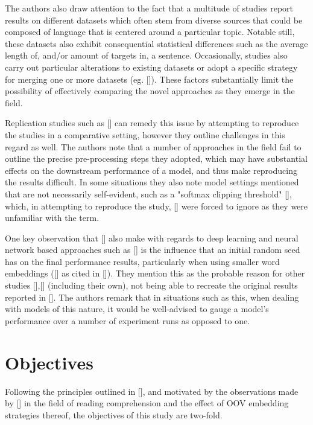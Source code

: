 \documentclass[12pt, a4paper]{report}
\theoremstyle{definition}
\theoremstyle{definition}%
\theoremstyle{definition}%
\theoremstyle{definition}%
\theoremstyle{definition}%
\theoremstyle{definition}%
\renewcommand{\cite}[1]{[\citealp{#1}]}
\begin{document}
The authors also draw attention to the fact that a multitude of studies report results on different datasets which often stem from diverse sources that could be composed of language that is centered around a particular topic. Notable still, these datasets also exhibit consequential statistical differences such as the average length of, and/or amount of targets in, a sentence. Occasionally, studies also carry out particular alterations to existing datasets or adopt a specific strategy for merging one or more datasets (eg. \cite{xue2018}). These factors substantially limit the possibility of effectively comparing the novel approaches as they emerge in the field.  

Replication studies such as \cite{moore2018} can remedy this issue by attempting to reproduce the studies in a comparative setting, however they outline challenges in this regard as well. The authors note that a number of approaches in the field fail to outline the precise pre-processing steps they adopted, which may have substantial effects on the downstream performance of a model, and thus make reproducing the results difficult. In some situations they also note model settings mentioned that are not necessarily self-evident, such as a "softmax clipping threshold" \cite{tang2016b}, which, in attempting to reproduce the study, \cite{moore2018} were forced to ignore as they were unfamiliar with the term. 

One key observation that \cite{moore2018} also make with regards to deep learning and neural network based approaches such as \cite{tang2016b} is the influence that an initial random seed has on the final performance results, particularly when using smaller word embeddings (\cite{reimers2017} as cited in \cite{moore2018}). They mention this as the probable reason for other studies \cite{chen2017},\cite{tay2017} (including their own), not being able to recreate the original results reported in \cite{tang2016b}. The authors remark that in situations such as this, when dealing with models of this nature, it would be well-advised to gauge a model's performance over a number of experiment runs as opposed to one.

\section{Objectives}
Following the principles outlined in \cite{moore2018}, and motivated by the observations made by \cite{bhuwandhingra2017} in the field of reading comprehension and the effect of OOV embedding strategies thereof, the objectives of this study are two-fold.
\end{document}
